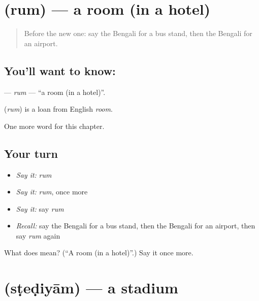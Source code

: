 \section[\texorpdfstring{\bn{রুম} (rum)}{রুম (rum)}]{ (rum) — a room (in a hotel)}

\label{lesson:BN-C217-rum}



\begin{quote}
Before the new one: say the Bengali for a bus stand, then the Bengali for an airport.
\end{quote}

\subsection*{You'll want to know: }
\textbf{} — \emph{rum} — \textquotedblleft{}a room (in a hotel)\textquotedblright{}.

\begin{cousinweb}
\textbf{} (\emph{rum}) is a loan from English \emph{room}.
\end{cousinweb}

\begin{grammarlens}[title={What you've built}]
One more word for this chapter.
\end{grammarlens}

\subsection*{Your turn}
\begin{itemize}
\raggedright
  \item \emph{Say it:} \emph{rum}
  \item \emph{Say it:} \emph{rum}, once more
  \item \emph{Say it:} say \emph{rum}
  \item \emph{Recall:} say the Bengali for a bus stand, then the Bengali for an airport, then say \emph{rum} again
\end{itemize}

\begin{tcolorbox}[breakable,colback=teal!4,colframe=teal!35!black,title={Before you move on}]
What does  mean? (\textquotedblleft{}A room (in a hotel)\textquotedblright{}.) Say it once more.
\end{tcolorbox}
\section[\texorpdfstring{\bn{স্টেডিয়াম} (sṭeḍiyām)}{স্টেডিয়াম (sṭeḍiyām)}]{ (sṭeḍiyām) — a stadium}

